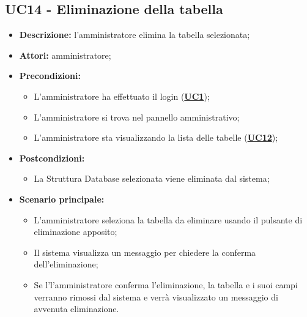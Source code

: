 \subsection{UC14 - Eliminazione della tabella}
\label{sec:UC14}
\begin{itemize}
	\item \textbf{Descrizione:} l’amministratore elimina la tabella selezionata;
	\item \textbf{Attori:} amministratore;
	\item \textbf{Precondizioni:} 
	\begin{itemize}
		\item L’amministratore ha effettuato il login (\hyperref[sec:UC1]{\textbf{UC1}});
		\item L’amministratore si trova nel pannello amministrativo;
		\item L’amministratore sta visualizzando la lista delle tabelle (\hyperref[sec:UC12]{\textbf{UC12}});
	\end{itemize}
	\item \textbf{Postcondizioni:} 
	\begin{itemize}
		\item La Struttura Database selezionata viene eliminata dal sistema;
	\end{itemize}
	\item \textbf{Scenario principale:} 
	\begin{itemize}
		\item L'amministratore seleziona la tabella da eliminare usando il pulsante di eliminazione apposito;
		\item Il sistema visualizza un messaggio per chiedere la conferma dell'eliminazione;
		\item Se l'l'amministratore conferma l'eliminazione, la tabella e i suoi campi verranno rimossi dal sistema e verrà visualizzato un messaggio di avvenuta eliminazione.
	\end{itemize}
\end{itemize}

